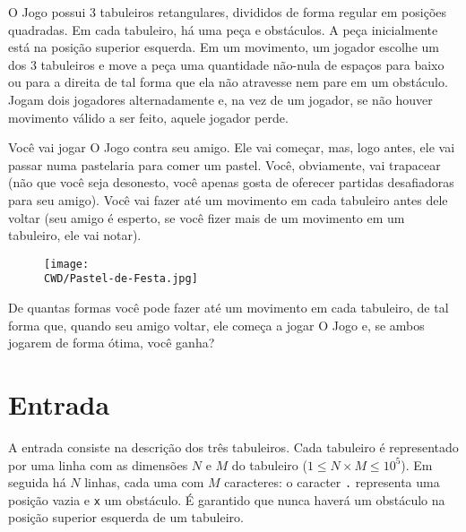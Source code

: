 %

O Jogo possui 3 tabuleiros retangulares, divididos de forma regular em posições quadradas. Em cada tabuleiro, há uma peça e obstáculos. A peça inicialmente está na posição superior esquerda. Em um movimento, um jogador escolhe um dos 3 tabuleiros e move a peça uma quantidade não-nula de espaços para baixo ou para a direita de tal forma que ela não atravesse nem pare em um obstáculo. Jogam dois jogadores alternadamente e, na vez de um jogador, se não houver movimento válido a ser feito, aquele jogador perde.

Você vai jogar O Jogo contra seu amigo. Ele vai começar, mas, logo antes, ele vai passar numa pastelaria para comer um pastel. Você, obviamente, vai trapacear (não que você seja desonesto, você apenas gosta de oferecer partidas desafiadoras para seu amigo). Você vai fazer até um movimento em cada tabuleiro antes dele voltar (seu amigo é esperto, se você fizer mais de um movimento em um tabuleiro, ele vai notar).

\begin{figure}[H]
    \centering
    \texttt{[image: \\CWD/Pastel-de-Festa.jpg]}
  \end{figure}

De quantas formas você pode fazer até um movimento em cada tabuleiro, de tal forma que, quando seu amigo voltar, ele começa a jogar O Jogo e, se ambos jogarem de forma ótima, você ganha?

%
%

\section*{Entrada}

A entrada consiste na descrição dos três tabuleiros. Cada tabuleiro é representado por uma linha com as dimensões $N$ e $M$ do tabuleiro ($1 \leq N\times M \leq 10^5$). Em seguida há $N$ linhas, cada uma com $M$ caracteres: o caracter {\tt .} representa uma posição vazia e {\tt x} um obstáculo. É garantido que nunca haverá um obstáculo na posição superior esquerda de um tabuleiro.

%
%

